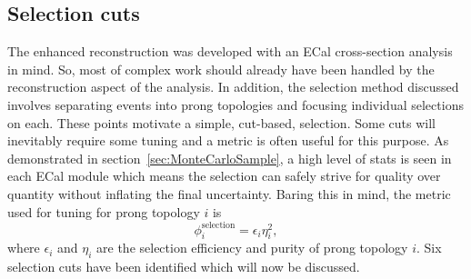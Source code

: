 \subsection{Selection cuts}
\label{subsec:SelectionCuts}
The enhanced reconstruction was developed with an ECal cross-section analysis in mind.  So, most of complex work should already have been handled by the reconstruction aspect of the analysis.  In addition, the selection method discussed involves separating events into prong topologies and focusing individual selections on each.  These points motivate a simple, cut-based, selection.  Some cuts will inevitably require some tuning and a metric is often useful for this purpose.  As demonstrated in section~\ref{sec:MonteCarloSample}, a high level of stats is seen in each ECal module which means the selection can safely strive for quality over quantity without inflating the final uncertainty.  Baring this in mind, the metric used for tuning for prong topology $i$ is
\begin{equation}
  \phi_i^{\textrm{selection}} = \epsilon_i\eta^2_i,
  \label{eqn:SelectionMetric}
\end{equation}
where $\epsilon_i$ and $\eta_i$ are the selection efficiency and purity of prong topology $i$.  Six selection cuts have been identified which will now be discussed. 

